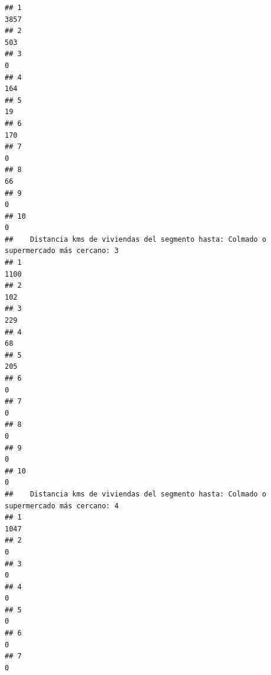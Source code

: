 \documentclass[11pt,]{article}
\begin{document}
\begin{verbatim}
## 1                                                                                  3857
## 2                                                                                   503
## 3                                                                                     0
## 4                                                                                   164
## 5                                                                                    19
## 6                                                                                   170
## 7                                                                                     0
## 8                                                                                    66
## 9                                                                                     0
## 10                                                                                    0
##    Distancia kms de viviendas del segmento hasta: Colmado o supermercado más cercano: 3
## 1                                                                                  1100
## 2                                                                                   102
## 3                                                                                   229
## 4                                                                                    68
## 5                                                                                   205
## 6                                                                                     0
## 7                                                                                     0
## 8                                                                                     0
## 9                                                                                     0
## 10                                                                                    0
##    Distancia kms de viviendas del segmento hasta: Colmado o supermercado más cercano: 4
## 1                                                                                  1047
## 2                                                                                     0
## 3                                                                                     0
## 4                                                                                     0
## 5                                                                                     0
## 6                                                                                     0
## 7                                                                                     0

\end{verbatim}
\end{document}
